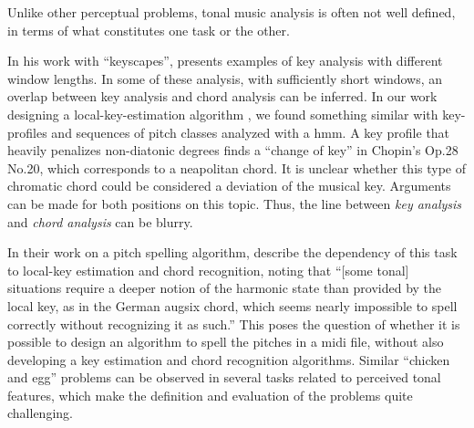 

Unlike other perceptual problems, tonal music analysis is
often not well defined, in terms of what constitutes one
task or the other.


In his work with ``keyscapes'',
\textcite{sapp2011computational} presents examples of key
analysis with different window lengths. In some of these
analysis, with sufficiently short windows, an overlap
between key analysis and chord analysis can be inferred. In
our work designing a local-key-estimation algorithm
\parencite{napoleslopez2019keyfinding}, we found something
similar with key-profiles and sequences of pitch classes
analyzed with a \gls{hmm}. A key profile that heavily
penalizes non-diatonic degrees finds a ``change of key'' in
Chopin's Op.28 No.20, which corresponds to a \gls{neapolitan}
chord. It is unclear whether this type of chromatic chord
could be considered a deviation of the musical key.
Arguments can be made for both positions on this topic.
Thus, the line between \emph{key analysis} and \emph{chord
analysis} can be blurry.


In their work on a pitch spelling algorithm,
\textcite{teodoru2007pitch} describe the dependency of this
task to local-key estimation and chord recognition, noting
that ``[some tonal] situations require a deeper notion of
the harmonic state than provided by the local key, as in the
German \gls{augsix} chord, which seems nearly impossible
to spell correctly without recognizing it as such.'' This
poses the question of whether it is possible to design an
algorithm to spell the pitches in a \gls{midi} file, without
also developing a key estimation and chord recognition
algorithms. Similar ``chicken and egg'' problems can be
observed in several tasks related to perceived tonal
features, which make the definition and evaluation of the
problems quite challenging.
